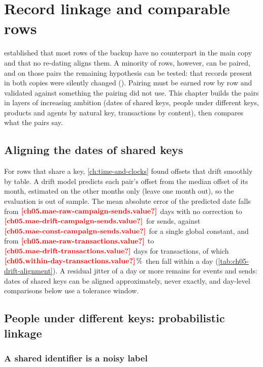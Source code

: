 \chapter{Record linkage and comparable rows}\label{ch:record-linkage}

 established that most rows of the backup have no counterpart in the main
copy and that no re-dating aligns them. A minority of rows, however, can be paired, and on those pairs the remaining
hypothesis can be tested: that records present in both copies were silently changed (). Pairing must be
earned row by row and validated against something the pairing did not use. This chapter builds the pairs in layers of
increasing ambition (dates of shared keys, people under different keys, products and agents by natural key,
transactions by content), then compares what the pairs say.

\section{Aligning the dates of shared keys}\label{sec:rl-dates}

For rows that share a key, \cref{ch:time-and-clocks} found offsets that drift smoothly by table. A drift model
predicts each pair's offset from the median offset of its month, estimated on the other months only (leave one month
out), so the evaluation is out of sample. The mean absolute error of the predicted date falls from
$\est{ch05.mae-raw-campaign-sends}{value}$ days with no correction to $\est{ch05.mae-drift-campaign-sends}{value}$ for
sends, against $\est{ch05.mae-const-campaign-sends}{value}$ for a single global constant, and from
$\est{ch05.mae-raw-transactions}{value}$ to $\est{ch05.mae-drift-transactions}{value}$ days for transactions, of which
$\est{ch05.within-day-transactions}{value}\,\%$ then fall within a day (\cref{tab:ch05-drift-alignment}). A residual
jitter of a day or more remains for events and sends: dates of shared keys can be aligned approximately, never exactly,
and day-level comparisons below use a tolerance window.



\section{People under different keys: probabilistic linkage}\label{sec:rl-fs}

\subsection{A shared identifier is a noisy label}

